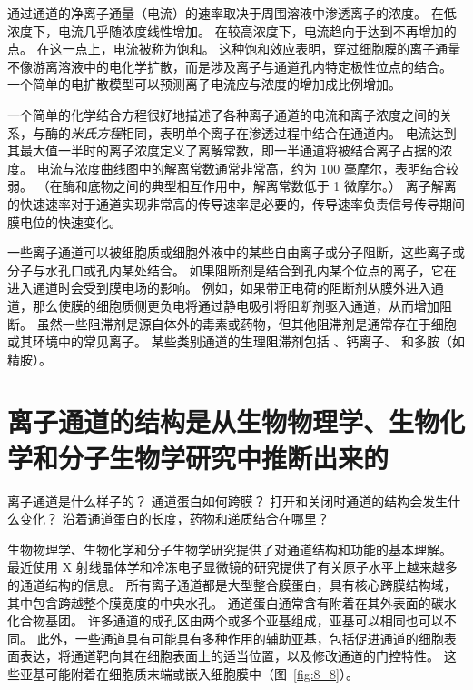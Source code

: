 通过通道的净离子通量（电流）的速率取决于周围溶液中渗透离子的浓度。
在低浓度下，电流几乎随浓度线性增加。
在较高浓度下，电流趋向于达到不再增加的点。
在这一点上，电流被称为饱和。
这种饱和效应表明，穿过细胞膜的离子通量不像游离溶液中的电化学扩散，而是涉及离子与通道孔内特定极性位点的结合。
一个简单的电扩散模型可以预测离子电流应与浓度的增加成比例增加。


一个简单的化学结合方程很好地描述了各种离子通道的电流和离子浓度之间的关系，与酶的\textit{米氏方程}相同，表明单个离子在渗透过程中结合在通道内。
电流达到其最大值一半时的离子浓度定义了离解常数，即一半通道将被结合离子占据的浓度。
电流与浓度曲线图中的解离常数通常非常高，约为 100 毫摩尔，表明结合较弱。
（在酶和底物之间的典型相互作用中，解离常数低于 1 微摩尔。）
离子解离的快速速率对于通道实现非常高的传导速率是必要的，传导速率负责信号传导期间膜电位的快速变化。


一些离子通道可以被细胞质或细胞外液中的某些自由离子或分子阻断，这些离子或分子与水孔口或孔内某处结合。
如果阻断剂是结合到孔内某个位点的离子，它在进入通道时会受到膜电场的影响。
例如，如果带正电荷的阻断剂从膜外进入通道，那么使膜的细胞质侧更负电将通过静电吸引将阻断剂驱入通道，从而增加阻断。
虽然一些阻滞剂是源自体外的毒素或药物，但其他阻滞剂是通常存在于细胞或其环境中的常见离子。
某些类别通道的生理阻滞剂包括 、钙离子、 和多胺（如精胺）。



\section{离子通道的结构是从生物物理学、生物化学和分子生物学研究中推断出来的}

离子通道是什么样子的？
通道蛋白如何跨膜？
打开和关闭时通道的结构会发生什么变化？
沿着通道蛋白的长度，药物和递质结合在哪里？


生物物理学、生物化学和分子生物学研究提供了对通道结构和功能的基本理解。
最近使用 X 射线晶体学和冷冻电子显微镜的研究提供了有关原子水平上越来越多的通道结构的信息。
所有离子通道都是大型整合膜蛋白，具有核心跨膜结构域，其中包含跨越整个膜宽度的中央水孔。
通道蛋白通常含有附着在其外表面的碳水化合物基团。 许多通道的成孔区由两个或多个亚基组成，亚基可以相同也可以不同。
此外，一些通道具有可能具有多种作用的辅助亚基，包括促进通道的细胞表面表达，将通道靶向其在细胞表面上的适当位置，以及修改通道的门控特性。
这些亚基可能附着在细胞质末端或嵌入细胞膜中（图~\ref{fig:8_8}）。


